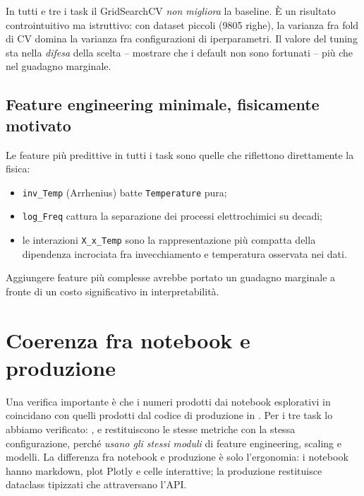 In tutti e tre i task il GridSearchCV \emph{non migliora} la baseline. È
un risultato controintuitivo ma istruttivo: con dataset piccoli
(\num{9805} righe), la varianza fra fold di CV domina la varianza fra
configurazioni di iperparametri. Il valore del tuning sta nella
\emph{difesa} della scelta -- mostrare che i default non sono fortunati
-- più che nel guadagno marginale.

\subsection{Feature engineering minimale, fisicamente motivato}

Le feature più predittive in tutti i task sono quelle che riflettono
direttamente la fisica:
\begin{itemize}
  \item \texttt{inv\_Temp} (Arrhenius) batte \texttt{Temperature} pura;
  \item \texttt{log\_Freq} cattura la separazione dei processi
        elettrochimici su decadi;
  \item le interazioni \texttt{X\_x\_Temp} sono la rappresentazione più
        compatta della dipendenza incrociata fra invecchiamento e
        temperatura osservata nei dati.
\end{itemize}

Aggiungere feature più complesse avrebbe portato un guadagno marginale a fronte di un costo
significativo in interpretabilità.

\section{Coerenza fra notebook e produzione}

Una verifica importante è che i numeri prodotti dai notebook esplorativi
in  coincidano con quelli prodotti dal codice di
produzione in . Per i tre task lo abbiamo verificato:
,  e
 restituiscono le stesse metriche con
la stessa configurazione, perché \emph{usano gli stessi moduli} di
feature engineering, scaling e modelli. La differenza fra notebook e
produzione è solo l'ergonomia: i notebook hanno markdown, plot Plotly e
celle interattive; la produzione restituisce dataclass tipizzati che
attraversano l'API.
